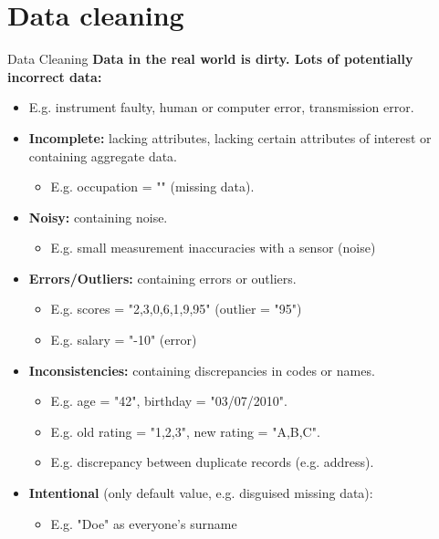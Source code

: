 \section{Data cleaning}

\begin{frame}{Data Cleaning}
	\textbf{Data in the real world is {\color{airforceblue}dirty}. Lots of
		potentially incorrect data:}
	\begin{itemize}
		\item E.g. instrument faulty, human or computer error, transmission
		      error.
		\item \textbf{\color{airforceblue}Incomplete:} lacking attributes,
		      lacking certain attributes of interest or containing aggregate data.
		      \begin{itemize}
			      \item E.g. occupation = "" (missing data).
		      \end{itemize}
		\item \textbf{\color{airforceblue}Noisy:} containing noise.
		      \begin{itemize}
			      \item E.g. small measurement inaccuracies with a sensor
			            (noise)
		      \end{itemize}
		\item \textbf{\color{airforceblue}Errors/Outliers:} containing errors
		      or outliers.
		      \begin{itemize}
			      \item E.g. scores = "2,3,0,6,1,9,95" (outlier = "95")
			      \item E.g. salary = "-10" (error)
		      \end{itemize}
		\item \textbf{\color{airforceblue}Inconsistencies:} containing
		      discrepancies in codes or names.
		      \begin{itemize}
			      \item E.g. age = "42", birthday = "03/07/2010".
			      \item E.g. old rating = "1,2,3", new rating = "A,B,C".
			      \item E.g. discrepancy between duplicate records (e.g. address).
		      \end{itemize}
		\item \textbf{\color{airforceblue}Intentional} (only default value,
		      e.g. disguised missing data):
		      \begin{itemize}
			      \item E.g. "Doe" as everyone's surname
		      \end{itemize}
	\end{itemize}
\end{frame}

